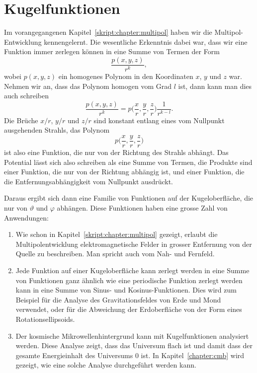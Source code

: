 %
%
%
\chapter{Kugelfunktionen%
\label{skript:chapter:kugelfunktionen}}
\rhead{}
Im vorangegangenen Kapitel~\ref{skript:chapter:multipol} haben wir
die Multipol-Entwicklung kennengelernt. 
Die wesentliche Erkenntnis dabei war, dass wir eine Funktion immer zerlegen
können in eine Summe von Termen der Form
\[
\frac{p(x,y,z)}{r^k},
\]
wobei $p(x,y,z)$ ein homogenes Polynom in den Koordinaten $x$, $y$ und
$z$ war.
Nehmen wir an, dass das Polynom homogen vom Grad $l$ ist, dann kann man dies
auch schreiben
\[
\frac{p(x,y,z)}{r^k}
=
p\biggl(\frac{x}{r},\frac{y}{r},\frac{z}{r}\biggr)\frac1{r^{k-l}}.
\]
Die Brüche $x/r$, $y/r$ und $z/r$ sind konstant entlang eines vom
Nullpunkt ausgehenden Strahls, das Polynom 
\[
p\biggl(\frac{x}{r},\frac{y}{r},\frac{z}{r}\biggr)
\]
ist also eine Funktion, die nur von der Richtung des Strahls
abhängt.
Das Potential lässt sich also schreiben als eine Summe von Termen,
die Produkte sind einer Funktion, die nur von der Richtung abhängig
ist, und einer Funktion, die die Entfernungsabhängigkeit vom Nullpunkt
ausdrückt.

Daraus ergibt sich dann eine Familie von Funktionen auf der Kugeloberfläche,
die nur von $\vartheta$ und $\varphi$ abhängen.
Diese Funktionen haben eine grosse Zahl von Anwendungen:

\begin{enumerate}
\item
Wie schon in Kapitel~\ref{skript:chapter:multipol} gezeigt, erlaubt 
die Multipolentwicklung elektromagnetische Felder in grosser
Entfernung von der Quelle zu beschreiben.
Man spricht auch vom Nah- und Fernfeld.
\item
Jede Funktion auf einer Kugeloberfläche kann zerlegt werden in eine
Summe von Funktionen ganz ähnlich wie eine periodische Funktion
zerlegt werden kann in eine Summe von Sinus- und Kosinus-Funktionen.
Dies wird zum Beispiel für die Analyse des Gravitationsfeldes von
Erde und Mond verwendet, oder für die Abweichung der Erdoberfläche
von der Form eines Rotationsellipsoids.
\item
Der kosmische Mikrowellenhintergrund kann mit Kugelfunktionen analysiert
werden.
Diese Analyse zeigt, dass das Universum flach ist und damit dass der
gesamte Energieinhalt des Universums $0$ ist.
In Kapitel~\ref{chapter:cmb} wird gezeigt, wie eine solche Analyse
durchgeführt werden kann.
\end{enumerate}

